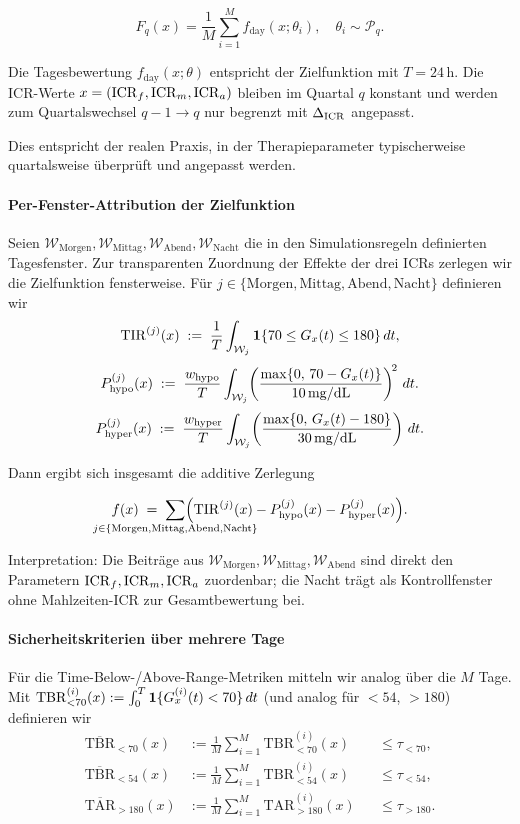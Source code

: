 \[
F_q(x) = \frac{1}{M} \sum_{i=1}^M f_{\text{day}}(x;\theta_i), \quad \theta_i \sim \mathcal P_q.
\]

Die Tagesbewertung \(f_{\text{day}}(x;\theta)\) entspricht der Zielfunktion mit \(T=24\,\mathrm{h}\). Die ICR-Werte \(x=(\mathrm{ICR}_f,\mathrm{ICR}_m,\mathrm{ICR}_a)\) bleiben im Quartal \(q\) konstant und werden zum Quartalswechsel \(q-1\to q\) nur begrenzt mit \(\Delta_{\mathrm{ICR}}\) angepasst.

Dies entspricht der realen Praxis, in der Therapieparameter typischerweise quartalsweise überprüft und angepasst werden\cite{ddg2023}.

\paragraph{Per-Fenster-Attribution der Zielfunktion}
Seien \(\mathcal W_{\mathrm{Morgen}}, \mathcal W_{\mathrm{Mittag}}, \mathcal W_{\mathrm{Abend}}, \mathcal W_{\mathrm{Nacht}}\) die in den Simulationsregeln definierten Tagesfenster. Zur transparenten Zuordnung der Effekte der drei ICRs zerlegen wir die Zielfunktion fensterweise. Für \(j\in\{\mathrm{Morgen},\mathrm{Mittag},\mathrm{Abend},\mathrm{Nacht}\}\) definieren wir
\[
\mathrm{TIR}^{(j)}(x)\;:=\;\frac{1}{T}\int_{\mathcal W_j} \mathbf{1}\{70\le G_x(t)\le 180\}\,dt,
\]
\[
P_{\mathrm{hypo}}^{(j)}(x)\;:=\;\frac{w_{\mathrm{hypo}}}{T}\int_{\mathcal W_j}\!\left(\frac{\max\{0,\,70-G_x(t)\}}{10\,\mathrm{mg/dL}}\right)^{\!2}\, dt.
\]
\[
P_{\mathrm{hyper}}^{(j)}(x)\;:=\;\frac{w_{\mathrm{hyper}}}{T}\int_{\mathcal W_j}\!\left(\frac{\max\{0,\,G_x(t)-180\}}{30\,\mathrm{mg/dL}}\right)\, dt.
\]
\medskip

\noindent Dann ergibt sich insgesamt die additive Zerlegung

\newcommand{\Jfen}{\{\mathrm{Morgen},\mathrm{Mittag},\mathrm{Abend},\mathrm{Nacht}\}}
\[
f(x) \;=\; \sum_{\mathclap{j\in\Jfen}}\Bigl(\mathrm{TIR}^{(j)}(x) - P_{\mathrm{hypo}}^{(j)}(x) - P_{\mathrm{hyper}}^{(j)}(x)\Bigr).
\]
\medskip

\noindent Interpretation: Die Beiträge aus \(\mathcal W_{\mathrm{Morgen}},\mathcal W_{\mathrm{Mittag}},\mathcal W_{\mathrm{Abend}}\) sind direkt den Parametern \(\mathrm{ICR}_f,\mathrm{ICR}_m,\mathrm{ICR}_a\) zuordenbar; die Nacht trägt als Kontrollfenster ohne Mahlzeiten-ICR zur Gesamtbewertung bei.
\medskip

\paragraph{Sicherheitskriterien über mehrere Tage}
Für die Time-Below-/Above-Range-Metriken mitteln wir analog über die \(M\) Tage. Mit \(\mathrm{TBR}^{(i)}_{<70}(x):=\int_0^T \mathbf{1}\{G^{(i)}_x(t)<70\}\,dt\) (und analog für \(<54\), \(>180\)) \cite{jpm14040359, 10.2337/dc16-2215} definieren wir
\begin{align*}
\overline{\mathrm{TBR}}_{<70}(x)  &:= \frac{1}{M}\sum_{i=1}^M \mathrm{TBR}^{(i)}_{<70}(x)  &&\le \tau_{<70},\\
\overline{\mathrm{TBR}}_{<54}(x)  &:= \frac{1}{M}\sum_{i=1}^M \mathrm{TBR}^{(i)}_{<54}(x)  &&\le \tau_{<54},\\
\overline{\mathrm{TAR}}_{>180}(x) &:= \frac{1}{M}\sum_{i=1}^M \mathrm{TAR}^{(i)}_{>180}(x) &&\le \tau_{>180}.
\end{align*}


